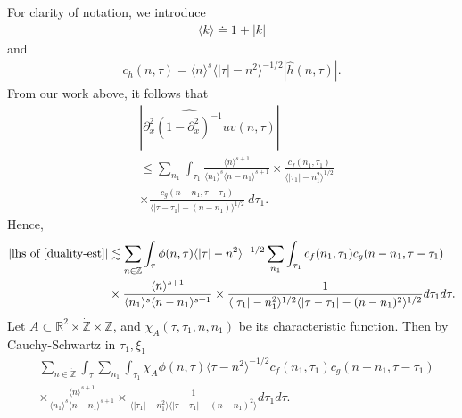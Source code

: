 \documentclass[12pt,reqno]{amsart}
\numberwithin{equation}{section}  %
\renewcommand{\cref}{\Cref}
\newcommand{\rr}{\mathbb{R}}
\newcommand{\zz}{\mathbb{Z}}
\newcommand{\zzdot}{\dot{\zz}}
\newcommand{\wh}{\widehat}
\newcommand{\p}{\partial}
\begin{document}
%
For clarity of notation, we introduce 
%
%
%
\begin{equation*}
\begin{split}
\langle k \rangle \doteq 1 + |k|
\end{split}
\end{equation*}
%
%
and
%
\begin{equation*}
	\begin{split}
		c_h(n, \tau) =
		\langle n \rangle ^s \langle |\tau| - n^{2} \rangle^{-1/2} | \wh{h}\left( n, \tau \right) |.
	\end{split}
\end{equation*}
%
%
From our work above, it follows that 
%
%
\begin{equation}
	\label{convo-est-starting-pnt}
	\begin{split}
		 &  | \wh{\p_{x}^{2}(1 - \p_{x}^{2})^{-1}uv}\left( 
		n, \tau \right) |
		\\
		& \le  
		\sum_{n_{1}} \int_{\tau_{1}} \frac{\langle n \rangle^{s+1}}{\langle n_1 \rangle^s
    \langle n - n_1 \rangle^{s+1}} 
    \times \frac{c_f(n_1, \tau_1)}{\langle |\tau_1| - n_1^{2} \rangle^{1/2}}
		\\
		& \times
		\frac{c_g(n - n_1, \tau - \tau_1 )}{\langle |\tau - \tau_1| - (n - n_1)
		\rangle^{1/2}}\ d \tau_1.
	\end{split}
\end{equation}
%
%
Hence, 
%
%
\begin{equation}
  \label{pre-fubini-int-form}
	\begin{split}
    |\text{lhs of} \ \cref{duality-est}|
    & \lesssim \sum_{n \in \zzdot} \int_{\tau} \phi(n, \tau)\langle | \tau | - n^{2} \rangle^{-1/2}  
  \sum_{n_{1}}
  \int_{\tau_{1}} c_f(n_1, \tau_1)
		c_g(n - n_1, \tau - \tau_1 )
		\\
    & \times \frac{\langle n \rangle ^{s+1}}{\langle n_{1} \rangle ^{s} \langle
    n-n_{1} \rangle ^{s+1}} \times \frac{1}{\langle |\tau_{1}|-n_{1}^{2} \rangle^{1/2}\langle | \tau -
    \tau_{1}|-(n - n_{1})^{2}
    \rangle^{1/2}} d \tau_1 d \tau.
	\end{split}
\end{equation}
%
%
%
Let $A \subset \rr^{2} \times \zzdot \times \zz$, and $\chi_{A}(\tau, \tau_{1}, n, n_{1})$
be its
characteristic function. Then by Cauchy-Schwartz in
$\tau_{1}, \xi_{1}$
\begin{equation*}
	\begin{split}
    & \sum_{n \in \zzdot} \int_{\tau}   \sum_{n_{1}}
    \int_{\tau_{1}} \chi_{A}
    \phi(n, \tau)  \langle \tau - n^{2} \rangle^{-1/2}
  c_f(n_1, \tau_1)
		c_g(n - n_1, \tau - \tau_1 )
		\\
    & \times 
    \frac{\langle n \rangle ^{s+1}}{\langle n_{1} \rangle ^{s} \langle
    n-n_{1} \rangle ^{s+1}} 
    \times \frac{1}{\langle |\tau_{1}|-n_{1}^{2} \rangle\langle | \tau -
    \tau_{1}|-(n - n_{1})^{2}
    \rangle} d \tau_1 d \tau.
	\end{split}
\end{equation*}
\end{document}
